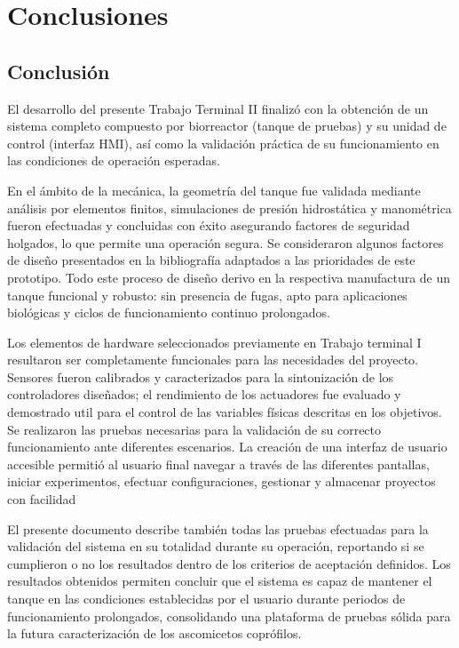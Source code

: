 \chapter{Conclusiones}\label{cap9}
\section{Conclusión}
El desarrollo del presente Trabajo Terminal II finalizó con la obtención de un sistema completo compuesto por biorreactor
(tanque de pruebas) y su unidad de control (interfaz HMI), así como la validación práctica de su funcionamiento en las condiciones de operación esperadas.

En el ámbito de la mecánica, la geometría del tanque fue validada mediante análisis
por elementos finitos, simulaciones de presión hidrostática y manométrica fueron
efectuadas y concluidas con éxito asegurando factores de seguridad holgados,
lo que permite una operación segura. Se consideraron algunos factores de diseño
presentados en la bibliografía adaptados a las prioridades de este prototipo. Todo este proceso de diseño derivo en la respectiva manufactura de un tanque funcional y robusto: sin presencia de fugas, apto para aplicaciones biológicas y ciclos de funcionamiento continuo prolongados.

Los elementos de hardware seleccionados previamente en Trabajo terminal I resultaron ser completamente funcionales para las necesidades del proyecto. Sensores fueron calibrados y caracterizados para la sintonización de los controladores diseñados; el rendimiento de los actuadores fue evaluado y demostrado util para el control de las variables físicas descritas en los objetivos. Se realizaron las pruebas necesarias para la validación de su correcto funcionamiento ante diferentes escenarios.
La creación de una interfaz de usuario accesible permitió al usuario final navegar a través de las diferentes pantallas, iniciar experimentos, efectuar configuraciones, gestionar y almacenar proyectos con facilidad

El presente documento describe también todas las pruebas efectuadas para la validación del sistema en su totalidad durante su operación, reportando si se cumplieron o no los resultados dentro de los criterios de aceptación definidos. Los resultados obtenidos permiten concluir que el sistema es capaz de mantener el tanque en las condiciones establecidas por el usuario durante periodos de funcionamiento prolongados, consolidando una plataforma de pruebas sólida para la futura caracterización de los ascomicetos coprófilos.

